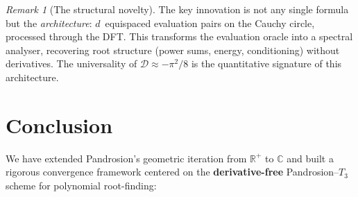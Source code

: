 \documentclass[10pt,a4paper,oneside]{book}
\theoremstyle{definition}
\theoremstyle{remark}
\newtheorem{remark}[theorem]{Remark}
\newcommand{\CC}{\mathbb{C}}
\newcommand{\RR}{\mathbb{R}}
\begin{document}
\begin{remark}[The structural novelty]
The key innovation is not any single formula but the \emph{architecture}: $d$~equispaced evaluation pairs on the Cauchy circle, processed through the DFT.  This transforms the evaluation oracle into a spectral analyser, recovering root structure (power sums, energy, conditioning) without derivatives.  The universality of $\mathcal{D} \approx -\pi^2/8$ is the quantitative signature of this architecture.
\end{remark}

\section{Conclusion}
\label{sec:conclusion_complex}

We have extended Pandrosion's geometric iteration from $\RR^+$ to $\CC$ and built a rigorous convergence framework centered on the \textbf{derivative-free} Pandrosion--$T_3$ scheme for polynomial root-finding:
\end{document}
